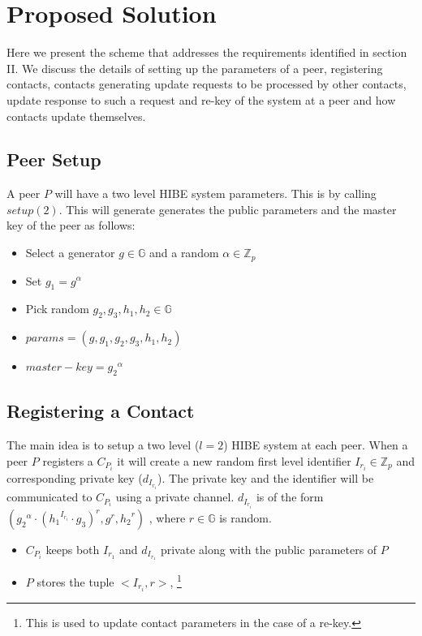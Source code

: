 \section{Proposed Solution}

Here we present the scheme that addresses the requirements identified in section II. We discuss the details of setting up the parameters of a peer, registering contacts, contacts generating update requests to be processed by other contacts, update response to such a request and re-key of the system at a peer and how contacts update themselves.

\subsection{Peer Setup}
A peer $P$ will have a two level HIBE system parameters. This is by calling $setup(2)$.
This will generate generates the public parameters and the master key of the peer as follows:
\begin{itemize}
	\item Select a generator $g \in \mathbb{G}$ and a random $\alpha \in \mathbb{Z}_p$
	\item Set $g_1 = g^{\alpha}$
	\item Pick random $g_2, g_3, h_1, h_2 \in \mathbb{G}$
	\item $params = (g, g_1, g_2, g_3, h_1, h_2)$
	\item $master-key = {g_2}^{\alpha}$
\end{itemize}


\subsection{Registering a Contact}

The main idea is to setup a two level ($l=2$) HIBE system at each peer. When a peer $P$ registers a $C_{P_i}$ it will create a new random first level identifier $I_{r_i} \in \mathbb{Z}_p$ and corresponding private key ($d_{I_{r_i}}$). The private key and the identifier will be communicated to $C_{P_i}$ using a private channel. $d_{I_{r_i}}$ is of the form
$({{g_2}^{\alpha}} \cdot {({{h_1}^{I_{r_i}}} \cdot {g_3} )}^r , g^r, {h_2}^r)$ ,
where $r \in \mathbb{G}$ is random.

\begin{itemize}
\item $C_{P_i}$ keeps both $I_{r_1}$ and $d_{I_{r_1}}$ private along with the public parameters of $P$
\item $P$ stores the tuple $<I_{r_i}, r>$, \footnote {This is used to update contact parameters in the case of a re-key.}
\end{itemize}


